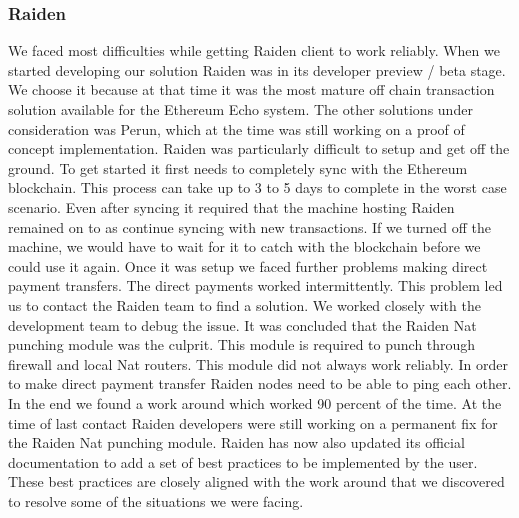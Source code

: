\subsubsection{Raiden}
We faced most difficulties while getting Raiden client to work reliably. When we started developing our solution Raiden was in its developer preview / beta stage. We choose it because at that time it was the most mature off chain transaction solution available for the Ethereum Echo system. The other solutions under consideration was Perun, which at the time was still working on a proof of concept implementation. Raiden was particularly difficult to setup and get off the ground. To get started it first needs to completely sync with the Ethereum blockchain. This process can take up to 3 to 5 days to complete in the worst case scenario. Even after syncing it required that the machine hosting Raiden remained on to as continue syncing with new transactions. If we turned off the machine, we would have to wait for it to catch with the blockchain before we could use it again.   Once it was setup we faced further problems making direct payment transfers. The direct payments worked intermittently.  This problem led us to contact the Raiden team to find a solution. We worked closely with the development team to debug the issue. It was concluded that the Raiden Nat punching module was the culprit. This module is required to punch through firewall and local Nat routers. This module did not always work reliably. In order to make direct payment transfer Raiden nodes need to be able to ping each other. In the end we found a work around which worked 90 percent of the time. At the time of last contact Raiden developers were still working on a permanent fix for the Raiden Nat punching module. Raiden has now also updated its official documentation \cite{rad:001} to add a set of best practices to be implemented by the user. These best practices are closely aligned with the work around that we discovered to resolve some of the situations we were facing.
\clearpage
